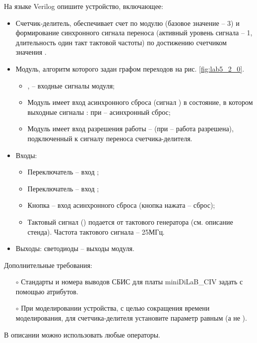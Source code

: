 На языке Verilog опишите устройство, включающее:
\begin{itemize}
	\item Счетчик-делитель, обеспечивает счет по модулю  (базовое значение -- 3) и формирование синхронного сигнала переноса (активный уровень сигнала -- 1, длительность один такт тактовой частоты) по достижению счетчиком значения .
	\item Модуль, алгоритм которого задан графом переходов на рис. \ref{fig:lab5_2_0}.
		\begin{itemize}
			\item {},  -- входные сигналы модуля;
			\item Модуль имеет вход асинхронного сброса (сигнал ) в состояние, в котором выходные сигналы : при  -- асинхронный сброс;
			\item Модуль имеет вход разрешения работы --  (при  -- работа разрешена), подключенный к сигналу переноса счетчика-делителя.
		\end{itemize}
	\item Входы:
		\begin{itemize}
			\item Переключатель  -- вход ;
			\item Переключатель  – вход ;
			\item Кнопка  – вход асинхронного сброса (кнопка нажата – сброс);
			\item Тактовый сигнал () подается от тактового генератора (см. описание стенда). Частота тактового сигнала – 25МГц.
		\end{itemize}
	\item Выходы: светодиоды  -- выходы модуля.
\end{itemize}

Дополнительные требования:
\begin{itemize}
	\item[$\circ$] Стандарты и номера выводов СБИС для платы miniDiLaB\_CIV задать с помощью атрибутов.
	\item[$\circ$] При моделировании устройства, с целью сокращения времени моделирования, для счетчика-делителя установите параметр  равным  (а не ).
\end{itemize}

В описании можно использовать любые операторы.

\newpage

